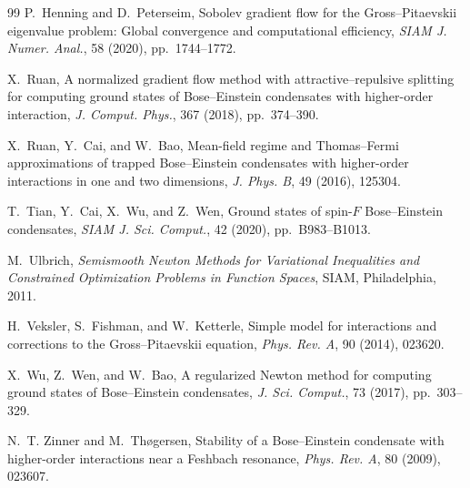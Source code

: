 \documentclass[11pt]{article}
\theoremstyle{plain}
\theoremstyle{definition}
\numberwithin{equation}{section}
\begin{document}
\begin{thebibliography}{99}
P.~Henning and D.~Peterseim,
\newblock Sobolev gradient flow for the Gross--Pitaevskii eigenvalue
problem: Global convergence and computational efficiency,
\newblock \emph{SIAM J. Numer. Anal.}, 58 (2020), pp.~1744--1772.

X.~Ruan,
\newblock A normalized gradient flow method with
attractive--repulsive splitting for computing ground states of
Bose--Einstein condensates with higher-order interaction,
\newblock \emph{J. Comput. Phys.}, 367 (2018), pp.~374--390.

X.~Ruan, Y.~Cai, and W.~Bao,
\newblock Mean-field regime and Thomas--Fermi approximations of
trapped Bose--Einstein condensates with higher-order interactions in
one and two dimensions,
\newblock \emph{J. Phys. B}, 49 (2016), 125304.

T.~Tian, Y.~Cai, X.~Wu, and Z.~Wen,
\newblock Ground states of spin-$F$ Bose--Einstein condensates,
\newblock \emph{SIAM J. Sci. Comput.}, 42 (2020), pp.~B983--B1013.

M.~Ulbrich,
\newblock \emph{Semismooth Newton Methods for Variational Inequalities and
Constrained Optimization Problems in Function Spaces},
\newblock SIAM, Philadelphia, 2011.

H.~Veksler, S.~Fishman, and W.~Ketterle,
\newblock Simple model for interactions and corrections to the
Gross--Pitaevskii equation,
\newblock \emph{Phys. Rev. A}, 90 (2014), 023620.

X.~Wu, Z.~Wen, and W.~Bao,
\newblock A regularized Newton method for computing ground states of
Bose--Einstein condensates,
\newblock \emph{J. Sci. Comput.}, 73 (2017), pp.~303--329.

N.~T. Zinner and M.~Th{\o}gersen,
\newblock Stability of a Bose--Einstein condensate with higher-order
interactions near a Feshbach resonance,
\newblock \emph{Phys. Rev. A}, 80 (2009), 023607.

\end{thebibliography}
\end{document}
